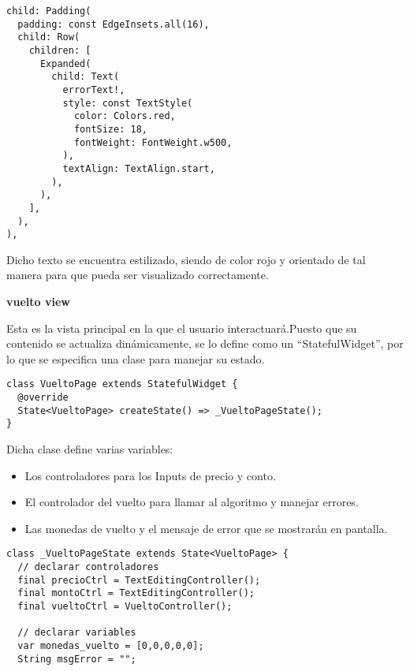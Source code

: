 \begin{center}
\begin{lstlisting}
child: Padding(
  padding: const EdgeInsets.all(16),
  child: Row(
    children: [
      Expanded(
        child: Text(
          errorText!,
          style: const TextStyle(
            color: Colors.red,
            fontSize: 18,
            fontWeight: FontWeight.w500,
          ),
          textAlign: TextAlign.start,
        ),
      ),
    ],
  ),
),
\end{lstlisting}
\end{center}

Dicho texto se encuentra estilizado, siendo de color rojo y orientado de tal manera para que pueda ser visualizado correctamente.

\textbf{vuelto view}

Esta es la vista principal en la que el usuario interactuará.Puesto que su contenido se actualiza dinámicamente, se lo define como un “StatefulWidget”, por lo que se especifica una clase para manejar su estado.

\begin{center}
\begin{lstlisting}
class VueltoPage extends StatefulWidget {
  @override
  State<VueltoPage> createState() => _VueltoPageState();
}
\end{lstlisting}
\end{center}

Dicha clase define varias variables:
\begin{itemize}
    \item Los controladores para los Inputs de precio y conto.
    
    \item El controlador del vuelto para llamar al algoritmo y manejar errores.
    
    \item Las monedas de vuelto y el mensaje de error que se mostrarán en pantalla.
\end{itemize}

\begin{center}
\begin{lstlisting}
class _VueltoPageState extends State<VueltoPage> {
  // declarar controladores
  final precioCtrl = TextEditingController();
  final montoCtrl = TextEditingController();
  final vueltoCtrl = VueltoController();

  // declarar variables
  var monedas_vuelto = [0,0,0,0,0];
  String msgError = "";
\end{lstlisting}
\end{center}

